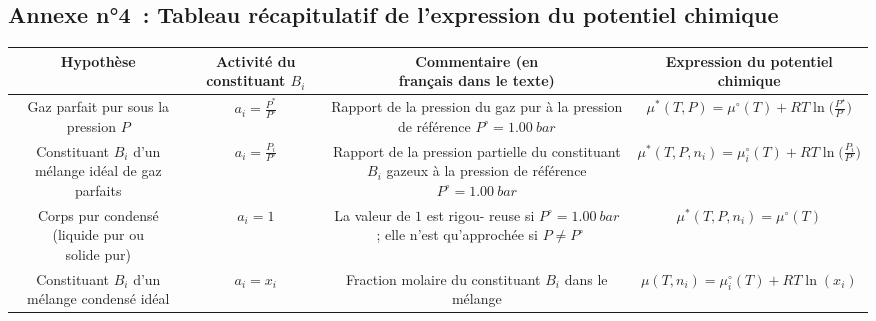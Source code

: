 \documentclass{article}
\newcommand{\ds}{\displaystyle}
\newcommand{\Pz}{P^\circ = \SI{1,00}{bar}}
\begin{document}
\subsection*{Annexe n°4~: Tableau récapitulatif de l’expression du potentiel chimique}
\vspace{-0.1cm}
\begin{table}[H]
\centering
\begin{tabular}{|c|c|c|c|}
   \hline
    \textbf{Hypothèse} & \makecell{\textbf{Activité du}\\\textbf{constituant $B_i$}} & \makecell{\textbf{Commentaire (en}\\\textbf{français dans le texte)}} & \makecell{\textbf{Expression du potentiel}\\\textbf{chimique}}\\
    \hline
    \makecell{Gaz parfait pur\\sous la pression $P$} & $\ds a_i = \frac{P^*}{P^\circ}$ & \makecell{Rapport de la pression\\du gaz pur à la\\ pression de référence\\$\Pz$} & $\ds\mu^*(T,P) = \mu^\circ(T) + RT\ln\bigg(\frac{P^\star}{P^\circ}\bigg)$\\
    \hline
    \makecell{Constituant $B_i$\\d'un mélange idéal\\de gaz parfaits} & $\ds a_i = \frac{P_i}{P^\circ}$ & \makecell{Rapport de la pression\\partielle du\\constituant $B_i$ gazeux\\à la pression de\\référence $\Pz$} & $\ds\mu^*(T,P,n_i) = \mu_i^\circ(T) + RT\ln\bigg(\frac{P_i}{P^\circ}\bigg)$\\
    \hline
    \makecell{Corps pur condensé\\(liquide pur ou\\solide pur)} & $\ds a_i = 1$ & \makecell{La valeur de $1$ est rigou-\\reuse si $\Pz$~;\\elle n'est qu'approchée\\si $P\neq P^\circ$} & $\ds\mu^*(T,P,n_i) = \mu^\circ(T)$\\
    \hline
    \makecell{Constituant $B_i$\\d'un mélange\\condensé idéal} & $\ds a_i = x_i$ & \makecell{Fraction molaire du\\constituant $B_i$ dans\\le mélange} & $\ds\mu(T,n_i) = \mu_i^\circ(T) + RT\ln(x_i)$\\

\end{tabular}
\end{table}
\end{document}

